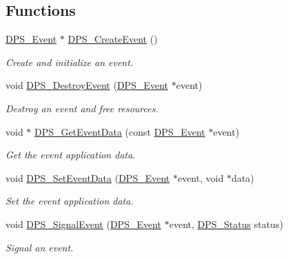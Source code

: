 \subsection*{Functions}
\begin{DoxyCompactItemize}
\item 
\hyperlink{group__event_ga97617da1bac0e76646713b8665dfdd85}{D\+P\+S\+\_\+\+Event} $\ast$ \hyperlink{group__event_gac38abc1e32666d631a40049c90bc66d3}{D\+P\+S\+\_\+\+Create\+Event} ()
\begin{DoxyCompactList}\small\item\em Create and initialize an event. \end{DoxyCompactList}\item 
void \hyperlink{group__event_ga7539f700336357cd320d6b40eba59c63}{D\+P\+S\+\_\+\+Destroy\+Event} (\hyperlink{group__event_ga97617da1bac0e76646713b8665dfdd85}{D\+P\+S\+\_\+\+Event} $\ast$event)
\begin{DoxyCompactList}\small\item\em Destroy an event and free resources. \end{DoxyCompactList}\item 
void $\ast$ \hyperlink{group__event_gaba8fce0d0896df9b6f294112a251e39f}{D\+P\+S\+\_\+\+Get\+Event\+Data} (const \hyperlink{group__event_ga97617da1bac0e76646713b8665dfdd85}{D\+P\+S\+\_\+\+Event} $\ast$event)
\begin{DoxyCompactList}\small\item\em Get the event application data. \end{DoxyCompactList}\item 
void \hyperlink{group__event_ga23a814c5aaebf5bdddebac0ef5d295ce}{D\+P\+S\+\_\+\+Set\+Event\+Data} (\hyperlink{group__event_ga97617da1bac0e76646713b8665dfdd85}{D\+P\+S\+\_\+\+Event} $\ast$event, void $\ast$data)
\begin{DoxyCompactList}\small\item\em Set the event application data. \end{DoxyCompactList}\item 
void \hyperlink{group__event_gad0f8a3b372f972bfaa97e29fa01b5c82}{D\+P\+S\+\_\+\+Signal\+Event} (\hyperlink{group__event_ga97617da1bac0e76646713b8665dfdd85}{D\+P\+S\+\_\+\+Event} $\ast$event, \hyperlink{group__status_ga30395a84d3cad9d4ec29848106415038}{D\+P\+S\+\_\+\+Status} status)
\begin{DoxyCompactList}\small\item\em Signal an event. \end{DoxyCompactList}\item 

\end{DoxyCompactItemize}
